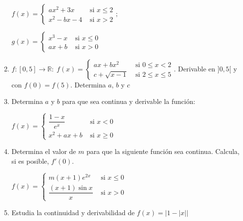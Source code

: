 \begin{enumerate}
\begin{multicols}{2}
		$f(x)=
	\begin{cases}
		ax^2+3x & \mbox{ si } x\le 2 \\
		x^2-bx-4 & \mbox{ si } x>2 
	\end{cases} ;$
	
	$g(x)=
	\begin{cases}
		x^3-x & \mbox{ si } x\le  0 \\
		ax+b & \mbox{ si } x>0  
	\end{cases} $
	
	\end{multicols}

		
		\rightline{\textcolor{gris}{Solución: Para $f(x): \quad a=2; \; b=-7; \qquad $ Para $g(x): \quad a=-1; \; b=0$ }}
		
		\item $f:[0,5]\to \mathbb R:\; f(x)=\begin{cases}
		ax+bx^2 & \mbox{ si } 0\le x < 2 \\
		c+\sqrt{x-1}  & \mbox{ si } 2 \le x \le 5	
		\end{cases}$. Derivable en $]0,5[$ y con $f(0)=f(5)$. Determina $a$, $b$ y $c$
		
		\rightline{\textcolor{gris}{Solución: $a=-3/2; \; b=1/2; \; c=-2$}}
		
		
	\item Determina $a$ y $b$ para que sea continua y derivable la función:
	
	$f(x)=\begin{cases}
		\dfrac {1-x}{e^x} & \mbox{ si } x<0 \\
		x^2+ax+b & \mbox{ si } x\ge 0	
		\end{cases}$
		
	\rightline{\textcolor{gris}{Solución:$a=-2; \; b=1$ }}
		
	
	\item Determina el valor de $m$ para que la siguiente función sea continua. Calcula, si es posible, $f'(0)$.
	
	$f(x)=\begin{cases}
		m(x+1)e^{2x} & \mbox{ si } x\le 0 \\
		\dfrac {(x+1)\sin x}{x} & \mbox{ si } x > 0	
		\end{cases}$
		
	\rightline{\textcolor{gris}{Solución: $m=1; \quad \nexists f'(0):\; f'_-(0)=2 \neq f'_+(0)=+\infty$}}
		
		
		\item Estudia la continuidad y derivabilidad de $f(x)=|1-|x||$
		

\end{enumerate}
